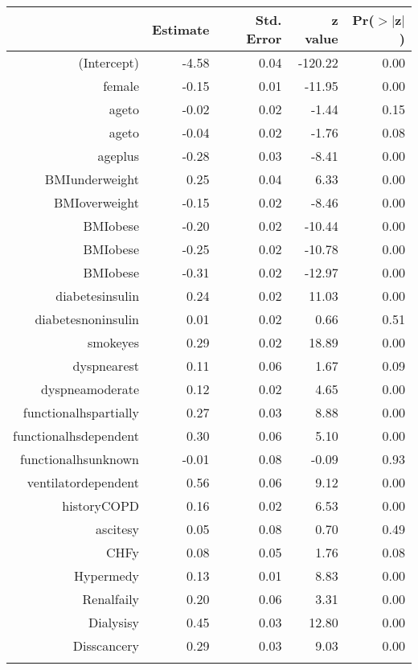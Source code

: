 \bigskip\bigskip
\centering
\begin{tabular}{rrrrr}
  \hline
 & Estimate & Std. Error & z value & Pr($>$$|$z$|$) \\ 
  \hline
(Intercept) & -4.58 & 0.04 & -120.22 & 0.00 \\ 
  female & -0.15 & 0.01 & -11.95 & 0.00 \\ 
  age\-65\-to\-74 & -0.02 & 0.02 & -1.44 & 0.15 \\ 
  age\-75\-to\-84 & -0.04 & 0.02 & -1.76 & 0.08 \\ 
  age\-85\-plus & -0.28 & 0.03 & -8.41 & 0.00 \\ 
  BMI\-underweight & 0.25 & 0.04 & 6.33 & 0.00 \\ 
  BMI\-overweight & -0.15 & 0.02 & -8.46 & 0.00 \\ 
  BMI\-obese\-1 & -0.20 & 0.02 & -10.44 & 0.00 \\ 
  BMI\-obese\-2 & -0.25 & 0.02 & -10.78 & 0.00 \\ 
  BMI\-obese\-3 & -0.31 & 0.02 & -12.97 & 0.00 \\ 
  diabetes\-insulin & 0.24 & 0.02 & 11.03 & 0.00 \\ 
  diabetes\-noninsulin & 0.01 & 0.02 & 0.66 & 0.51 \\ 
  smoke\-yes & 0.29 & 0.02 & 18.89 & 0.00 \\ 
  dyspnea\-rest & 0.11 & 0.06 & 1.67 & 0.09 \\ 
  dyspnea\-moderate & 0.12 & 0.02 & 4.65 & 0.00 \\ 
  functional\-hs\-partially & 0.27 & 0.03 & 8.88 & 0.00 \\ 
  functional\-hs\-dependent & 0.30 & 0.06 & 5.10 & 0.00 \\ 
  functional\-hs\-unknown & -0.01 & 0.08 & -0.09 & 0.93 \\ 
  ventilator\-dependent & 0.56 & 0.06 & 9.12 & 0.00 \\ 
  history\-COPD & 0.16 & 0.02 & 6.53 & 0.00 \\ 
  ascites\-y & 0.05 & 0.08 & 0.70 & 0.49 \\ 
  CHF\-y & 0.08 & 0.05 & 1.76 & 0.08 \\ 
  Hyper\-med\-y & 0.13 & 0.01 & 8.83 & 0.00 \\ 
  Renal\-fail\-y & 0.20 & 0.06 & 3.31 & 0.00 \\ 
  Dialysis\-y & 0.45 & 0.03 & 12.80 & 0.00 \\ 
  Diss\-cancer\-y & 0.29 & 0.03 & 9.03 & 0.00 \\ 
$$
\end{tabular}

